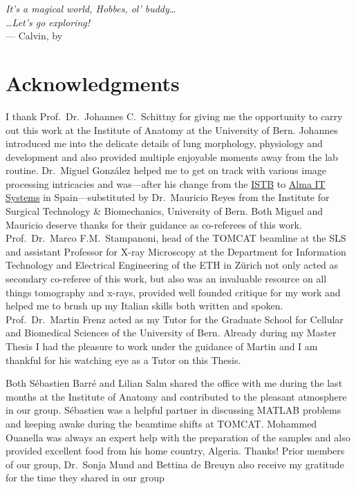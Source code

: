 
\begin{flushright}{\slshape    
		It's a magical world, Hobbes, ol' buddy\dots\\
		\dots Let's go exploring!}\\ \medskip
		--- Calvin, by \citep{Watterson1996}
\end{flushright}

\bigskip
\begingroup
\let\clearpage\relax
\let\cleardoublepage\relax
\let\cleardoublepage\relax
\chapter*{Acknowledgments}
I thank Prof.\ Dr.\ Johannes C.\ Schittny for giving me the opportunity to carry out this work at the Institute of Anatomy at the University of Bern. Johannes introduced me into the delicate details of lung morphology, physiology and development and also provided multiple enjoyable moments away from the lab routine. Dr.\ Miguel González helped me to get on track with various image processing intricacies and was---after his  change from the \href{http://www.istb.unibe.ch/}{ISTB} to \href{http://www.alma3d.com/en}{Alma IT Systems} in Spain---substituted by Dr.\ Mauricio Reyes from the Institute for Surgical Technology \& Biomechanics, University of Bern. Both Miguel and Mauricio deserve thanks for their guidance as co-referees of this work. Prof.\ Dr.\ Marco F.M.\ Stampanoni, head of the \acs{TOMCAT} beamline at the \acl{SLS} and assistant Professor for X-ray Microscopy at the Department for Information Technology and Electrical Engineering of the ETH in Zürich not only acted as secondary co-referee of this work, but also was an invaluable resource on all things tomography and x-rays, provided well founded critique for my work and helped me to brush up my Italian skills both written and spoken. Prof.\ Dr.\ Martin Frenz acted as my Tutor for the Graduate School for Cellular and Biomedical Sciences of the University of Bern. Already during my Master Thesis I had the pleasure to work under the guidance of  Martin and I am thankful for his watching eye as a Tutor on this Thesis.

Both Sébastien Barré and Lilian Salm shared the office with me during the last months at the Institute of Anatomy and contributed to the pleasant atmosphere in our group. Sébastien was a helpful partner in discussing MATLAB problems and keeping awake during the beamtime shifts at \acs{TOMCAT}. Mohammed Ouanella was always an expert help with the preparation of the samples and also provided excellent food from his home country, Algeria. Thanks! Prior members of our group, Dr.\ Sonja Mund and Bettina de Breuyn also receive my gratitude for the time they shared in our group

